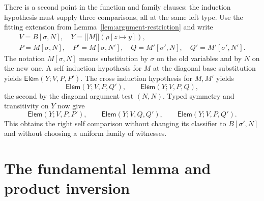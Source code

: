 \documentclass[11pt,a4paper]{article}
\theoremstyle{definition}
\theoremstyle{remark}
\newcommand{\ev}[1]{\mathopen{[\![}#1\mathclose{]\!]}}
\newcommand{\ElemRel}{\mathsf{Elem}}
\begin{document}
There is a second point in the function and family clauses: the induction
hypothesis must supply three comparisons, all at the same left type.
Use the fitting extension from Lemma~\ref{lem:argument-restriction} and
write
\[
\begin{gathered}
 V=B[\sigma,N],\quad Y=\ev M(\rho[z\mapsto y]),\\
 P=M[\sigma,N],\quad P'=M[\sigma,N'],\quad
 Q=M'[\sigma',N],\quad Q'=M'[\sigma',N'].
\end{gathered}
\]
The notation $M[\sigma,N]$ means substitution by $\sigma$ on the old
variables and by $N$ on the new one. A self induction hypothesis for
$M$ at the diagonal base substitution yields $\ElemRel(Y;V,P,P')$.
The cross induction hypothesis for $M,M'$ yields
\[
 \ElemRel(Y;V,P,Q'),\qquad \ElemRel(Y;V,P,Q),
\]
the second by the diagonal argument test $(N,N)$.
Typed symmetry and transitivity on $Y$ now give
\begin{equation}\label{eq:three-body-comparisons}
 \ElemRel(Y;V,P,P'),\qquad
 \ElemRel(Y;V,Q,Q'),\qquad
 \ElemRel(Y;V,P,Q').
\end{equation}
This obtains the right self comparison without changing its classifier
to $B[\sigma',N]$ and without choosing a uniform family of witnesses.

\section{The fundamental lemma and product inversion}
\end{document}
